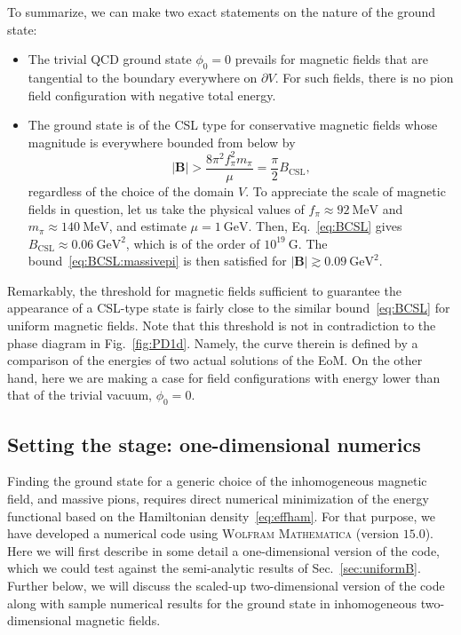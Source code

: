 \documentclass[pdflatex,iicol,sn-mathphys-num]{sn-jnl}
\let\m=\mu
\let\p=\phi
\let\de=\partial
\newcommand{\vek}[1]{\bm{#1}}%
\begin{document}
To summarize, we can make two exact statements on the nature of the ground state:
\begin{itemize}
\item The trivial QCD ground state $\p_0=0$ prevails for magnetic fields that are tangential to the boundary everywhere on $\de V$. For such fields, there is no pion field configuration with negative total energy.
\item The ground state is of the CSL type for conservative magnetic fields whose magnitude is everywhere bounded from below by
\begin{equation}
|\vek B|>\frac{8\pi^2f_\pi^2m_\pi}{\m}=\frac{\pi}{2}B_\text{CSL},
\label{eq:BCSL:massivepi}
\end{equation}
regardless of the choice of the domain $V$. To appreciate the scale of magnetic fields in question, let us take the physical values of $f_\pi\approx92~\text{MeV}$ and $m_\pi\approx140~\text{MeV}$, and estimate $\mu=1~\text{GeV}$. Then, Eq.~\eqref{eq:BCSL} gives $B_\text{CSL}\approx0.06~\text{GeV}^{2}$, which is of the order of $10^{19}~\text{G}$. The bound~\eqref{eq:BCSL:massivepi} is then satisfied for $|\vek B|\gtrsim0.09~\text{GeV}^{2}$.
\end{itemize}
Remarkably, the threshold for magnetic fields sufficient to guarantee the appearance of a CSL-type state is fairly close to the similar bound~\eqref{eq:BCSL} for uniform magnetic fields. Note that this threshold is not in contradiction to the phase diagram in Fig.~\ref{fig:PD1d}. Namely, the curve therein is defined by a comparison of the energies of two actual solutions of the EoM. On the other hand, here we are making a case for field configurations with energy lower than that of the trivial vacuum, $\p_0=0$.


\subsection{Setting the stage: one-dimensional numerics}
\label{subsec:nonuniformBnonzeroMbenchmark}

Finding the ground state for a generic choice of the inhomogeneous magnetic field, and massive pions, requires direct numerical minimization of the energy functional based on the Hamiltonian density~\eqref{eq:effham}. For that purpose, we have developed a numerical code using \textsc{Wolfram Mathematica} (version $15.0$). Here we will first describe in some detail a one-dimensional version of the code, which we could test against the semi-analytic results of Sec.~\ref{sec:uniformB}. Further below, we will discuss the scaled-up two-dimensional version of the code along with sample numerical results for the ground state in inhomogeneous two-dimensional magnetic fields.
\end{document}
